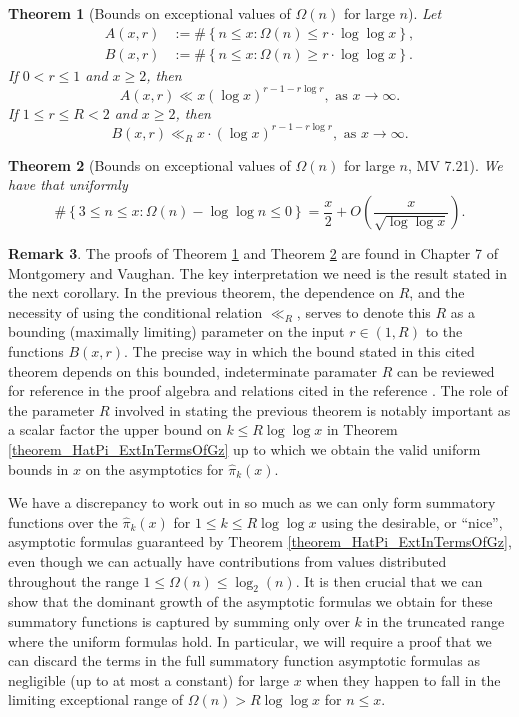 \documentclass[11pt,reqno,a4letter]{article}
\numberwithin{figure}{section}
\numberwithin{table}{section}
\theoremstyle{plain}
\newtheorem{theorem}{Theorem}
\numberwithin{theorem}{section}
\theoremstyle{definition}
\newtheorem{remark}[theorem]{Remark}
\begin{document}
\begin{theorem}[Bounds on exceptional values of $\Omega(n)$ for large $n$] 
\label{theorem_MV_Thm7.20-init_stmt} 
Let 
\begin{align*} 
A(x, r) & := \#\left\{n \leq x: \Omega(n) \leq r \cdot \log\log x\right\}, \\ 
B(x, r) & := \#\left\{n \leq x: \Omega(n) \geq r \cdot \log\log x\right\}. 
\end{align*} 
If $0 < r \leq 1$ and $x \geq 2$, then 
\[
A(x, r) \ll x (\log x)^{r-1 - r\log r}, \text{ \ as\ } x \rightarrow \infty. 
\]
If $1 \leq r \leq R < 2$ and $x \geq 2$, then 
\[
B(x, r) \ll_R x \cdot (\log x)^{r-1-r \log r}, \text{ \ as\ } x \rightarrow \infty. 
\]
\end{theorem} 

\begin{theorem}[Bounds on exceptional values of $\Omega(n)$ for large $n$, MV 7.21] 
\label{theorem_MV_Thm7.21-init_stmt} 
We have that uniformly 
\[
\#\left\{3 \leq n \leq x: \Omega(n) - \log\log n \leq 0\right\} = 
     \frac{x}{2} + O\left(\frac{x}{\sqrt{\log\log x}}\right). 
\]
\end{theorem} 

\begin{remark} 
The proofs of Theorem \ref{theorem_MV_Thm7.20-init_stmt} and 
Theorem \ref{theorem_MV_Thm7.21-init_stmt} 
are found in Chapter 7 of Montgomery and Vaughan. 
The key interpretation we need is the result stated in the next corollary. 
In the previous theorem, the dependence on $R$, and the necessity of using the 
conditional relation $\ll_R$, serves to denote this $R$ as a 
bounding (maximally limiting) parameter on the 
input $r \in (1, R)$ to the functions $B(x, r)$. 
The precise way in which the bound 
stated in this cited theorem depends on this bounded, 
indeterminate paramater $R$ can be reviewed for reference in the proof 
algebra and relations cited in the reference \cite[\S 7]{MV}. 
The role of the parameter $R$ involved in stating the previous theorem 
is notably important as a scalar factor the upper bound on $k \leq R\log\log x$ in 
Theorem \ref{theorem_HatPi_ExtInTermsOfGz} up to which 
we obtain the valid uniform bounds in $x$ on the asymptotics for 
$\widehat{\pi}_k(x)$. 

We have a discrepancy to work out in so much as we 
can only form summatory functions over the $\widehat{\pi}_k(x)$ for 
$1 \leq k \leq R\log\log x$ using the desirable, or ``nice'', asymptotic formulas
guaranteed by Theorem \ref{theorem_HatPi_ExtInTermsOfGz}, even though we can actually 
have contributions from values distributed throughout the range $1 \leq \Omega(n) \leq \log_2(n)$. 
It is then crucial that we can show that the dominant growth of the asymptotic formulas we obtain 
for these summatory functions is captured by summing only over $k$ in the truncated range 
where the uniform formulas hold. In particular, we will require a proof 
that we can discard the terms in the full summatory function 
asymptotic formulas as negligible (up to at most a constant) 
for large $x$ when they happen to fall in the 
limiting exceptional range of $\Omega(n) > R\log\log x$ for $n \leq x$. 
\end{remark} 
\end{document}
